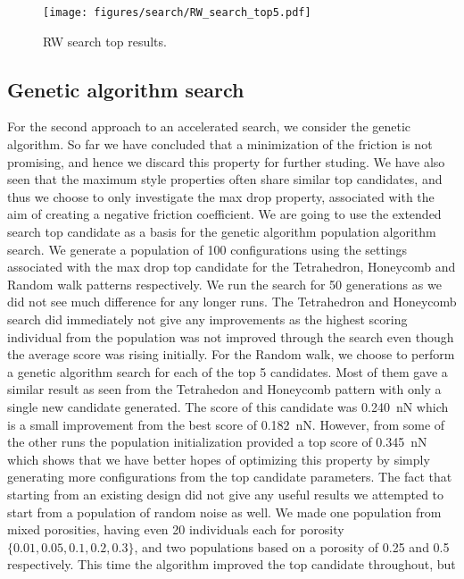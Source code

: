 \begin{figure}[H]
  \centering
  \texttt{[image: figures/search/RW\_search\_top5.pdf]}
  \caption{RW search top results.}
  \label{fig:RW_search_top5}
\end{figure}  



\subsection{Genetic algorithm search}

For the second approach to an accelerated search, we consider the genetic
algorithm. So far we have concluded that a minimization of the friction is not
promising, and hence we discard this property for further studing. We have also
seen that the maximum style properties often share similar top candidates, and
thus we choose to only investigate the max drop property, associated with the
aim of creating a negative friction coefficient. We are going to use the
extended search top candidate as a basis for the genetic algorithm population
algorithm search. We generate a population of 100 configurations using the
settings associated with the max drop top candidate for the Tetrahedron,
Honeycomb and Random walk patterns respectively. We run the search for 50
generations as we did not see much difference for any longer runs. The
Tetrahedron and Honeycomb search did immediately not give any improvements as
the highest scoring individual from the population was not improved through the
search even though the average score was rising initially. For the Random walk,
we choose to perform a genetic algorithm search for each of the top 5
candidates. Most of them gave a similar result as seen from the Tetrahedon and
Honeycomb pattern with only a single new candidate generated. The score of this
candidate was \SI{0.240}{nN} which is a small improvement from the best score of
\SI{0.182}{nN}. However, from some of the other runs the population
initialization provided a top score of \SI{0.345}{nN} which shows that we have
better hopes of optimizing this property by simply generating more
configurations from the top candidate parameters. The fact that starting from an
existing design did not give any useful results we attempted to start from a
population of random noise as well. We made one population from mixed
porosities, having even 20 individuals each for porosity  $\{0.01, 0.05, 0.1,
0.2, 0.3\}$, and two populations based on a porosity of 0.25 and 0.5
respectively. This time the algorithm improved the top candidate throughout, but
